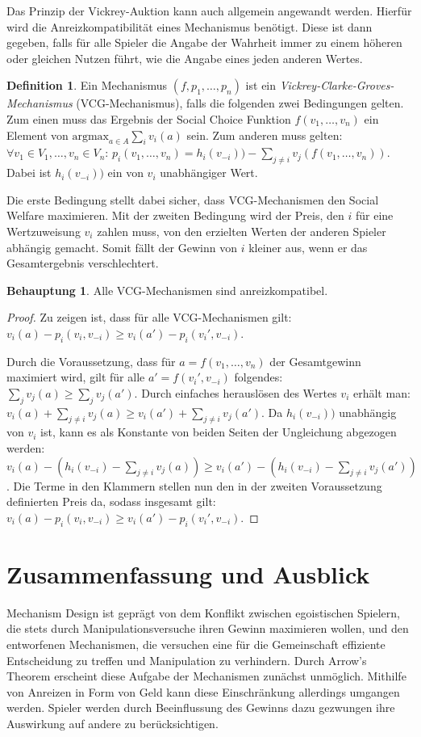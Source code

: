 \documentclass[a4paper,11pt]{article}
\theoremstyle{definition}
\newtheorem{definition}{Definition}
\theoremstyle{plain}
\theoremstyle{definition}
\newtheorem{claim}{Behauptung}
\begin{document}
Das Prinzip der Vickrey-Auktion kann auch allgemein angewandt werden. Hierfür wird die Anreizkompatibilität eines Mechanismus benötigt. Diese ist dann gegeben, falls für alle Spieler die Angabe der Wahrheit immer zu einem höheren oder gleichen Nutzen führt, wie die Angabe eines jeden anderen Wertes.

\begin{definition}
	\label{def:vcg}
	Ein Mechanismus $(f, p_1,\ldots,p_n)$ ist ein \emph{Vickrey-Clarke-Groves-Mechanismus} (VCG-Mechanismus), falls die folgenden zwei Bedingungen gelten.
	Zum einen muss das Ergebnis der Social Choice Funktion $f(v_1,\ldots , v_n)$ ein Element von $\text{argmax}_{a\in A} \sum_i v_i(a)$ sein.
	Zum anderen muss gelten: $\forall v_1 \in V_1,\ldots,v_n\in V_n$: $p_i(v_1,\ldots,v_n)=h_i(v_{-i})) - \sum_{j\neq i}v_j(f(v_1,\ldots,v_n))$. Dabei ist $h_i(v_{-i}))$ ein von $v_i$ unabhängiger Wert.
\end{definition}

Die erste Bedingung stellt dabei sicher, dass VCG-Mechanismen den Social Welfare maximieren. Mit der zweiten Bedingung wird der Preis, den $i$ für eine Wertzuweisung $v_i$ zahlen muss, von den erzielten Werten der anderen Spieler abhängig gemacht. Somit fällt der Gewinn von $i$ kleiner aus, wenn er das Gesamtergebnis verschlechtert.

\begin{claim}
	Alle VCG-Mechanismen sind anreizkompatibel.
\end{claim}

\begin{proof}
	Zu zeigen ist, dass für alle VCG-Mechanismen gilt: $v_i(a)-p_i(v_i, v_{-i})\geq v_i(a')-p_i(v_i', v_{-i})$. 
	
	Durch die Voraussetzung, dass für $a = f(v_1,\ldots,v_n)$ der Gesamtgewinn maximiert wird, gilt für alle $a'=f(v_i',v_{-i})$ folgendes: $\sum_{j} v_j(a) \geq \sum_{j} v_j(a')$. Durch einfaches herauslösen des Wertes $v_i$ erhält man: $v_i(a)+\sum_{j\neq i} v_j(a) \geq v_i(a') + \sum_{j\neq i} v_j(a')$. Da $h_i(v_{-i}))$ unabhängig von $v_i$ ist, kann es als Konstante von beiden Seiten der Ungleichung abgezogen werden: $v_i(a)-(h_i(v_{-i}) - \sum_{j\neq i} v_j(a)) \geq v_i(a') -(h_i(v_{-i}) - \sum_{j\neq i} v_j(a'))$. Die Terme in den Klammern stellen nun den in der zweiten Voraussetzung definierten Preis da, sodass insgesamt gilt: $v_i(a)-p_i(v_i, v_{-i})\geq v_i(a')-p_i(v_i', v_{-i})$. 
\end{proof}

\section{Zusammenfassung und Ausblick}
Mechanism Design ist geprägt von dem Konflikt zwischen egoistischen Spielern, die stets durch Manipulationsversuche ihren Gewinn maximieren wollen, und den entworfenen Mechanismen, die versuchen eine für die Gemeinschaft effiziente Entscheidung zu treffen und Manipulation zu verhindern. Durch Arrow's Theorem erscheint diese Aufgabe der Mechanismen zunächst unmöglich. Mithilfe von Anreizen in Form von Geld kann diese Einschränkung allerdings umgangen werden. Spieler werden durch Beeinflussung des Gewinns dazu gezwungen ihre Auswirkung auf andere zu berücksichtigen.
\end{document}
